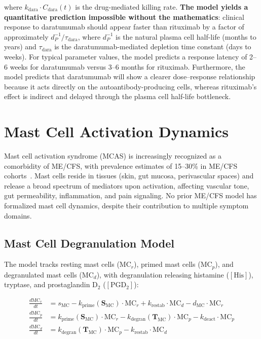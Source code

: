 where $k_{\text{dara}} \cdot C_{\text{dara}}(t)$ is the drug-mediated killing rate. \textbf{The model yields a quantitative prediction impossible without the mathematics}: clinical response to daratumumab should appear faster than rituximab by a factor of approximately $d_P^{-1} / \tau_{\text{dara}}$, where $d_P^{-1}$ is the natural plasma cell half-life (months to years) and $\tau_{\text{dara}}$ is the daratumumab-mediated depletion time constant (days to weeks). For typical parameter values, the model predicts a response latency of 2--6 weeks for daratumumab versus 3--6 months for rituximab. Furthermore, the model predicts that daratumumab will show a clearer dose--response relationship because it acts directly on the autoantibody-producing cells, whereas rituximab's effect is indirect and delayed through the plasma cell half-life bottleneck.

\section{Mast Cell Activation Dynamics}
\label{sec:mast-cell-model}

Mast cell activation syndrome (MCAS) is increasingly recognized as a comorbidity of ME/CFS, with prevalence estimates of 15--30\% in ME/CFS cohorts~\cite{Frioni2024MCAS}. Mast cells reside in tissues (skin, gut mucosa, perivascular spaces) and release a broad spectrum of mediators upon activation, affecting vascular tone, gut permeability, inflammation, and pain signaling. No prior ME/CFS model has formalized mast cell dynamics, despite their contribution to multiple symptom domains.

\subsection{Mast Cell Degranulation Model}

The model tracks resting mast cells ($\text{MC}_r$), primed mast cells ($\text{MC}_p$), and degranulated mast cells ($\text{MC}_d$), with degranulation releasing histamine ($[\text{His}]$), tryptase, and prostaglandin D$_2$ ($[\text{PGD}_2]$):

\begin{align}
\label{eq:mast-cell-dynamics}
\frac{d\text{MC}_r}{dt} &= s_{\text{MC}} - k_{\text{prime}}(\boldsymbol{S}_{\text{MC}}) \cdot \text{MC}_r + k_{\text{restab}} \cdot \text{MC}_d - d_{\text{MC}} \cdot \text{MC}_r \\
\frac{d\text{MC}_p}{dt} &= k_{\text{prime}}(\boldsymbol{S}_{\text{MC}}) \cdot \text{MC}_r - k_{\text{degran}}(\boldsymbol{T}_{\text{MC}}) \cdot \text{MC}_p - k_{\text{deact}} \cdot \text{MC}_p \\
\frac{d\text{MC}_d}{dt} &= k_{\text{degran}}(\boldsymbol{T}_{\text{MC}}) \cdot \text{MC}_p - k_{\text{restab}} \cdot \text{MC}_d
\end{align}

